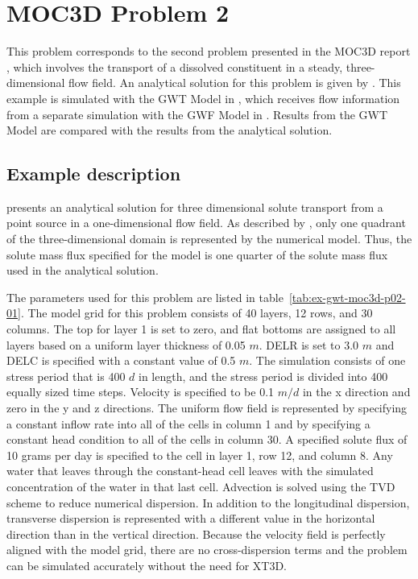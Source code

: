 \section{MOC3D Problem 2}

This problem corresponds to the second problem presented in the MOC3D report \cite{konikow1996three}, which involves the transport of a dissolved constituent in a steady, three-dimensional flow field.  An analytical solution for this problem is given by \cite{wexler1992}.  This example is simulated with the GWT Model in \mf, which receives flow information from a separate simulation with the GWF Model in \mf.  Results from the GWT Model are compared with the results from the \cite{wexler1992} analytical solution.

\subsection{Example description}
\cite{wexler1992} presents an analytical solution for three dimensional solute transport from a point source in a one-dimensional flow field.  As described by \cite{konikow1996three}, only one quadrant of the three-dimensional domain is represented by the numerical model.  Thus, the solute mass flux specified for the model is one quarter of the solute mass flux used in the analytical solution.  

The parameters used for this problem are listed in table~\ref{tab:ex-gwt-moc3d-p02-01}.  The model grid for this problem consists of 40 layers, 12 rows, and 30 columns.  The top for layer 1 is set to zero, and flat bottoms are assigned to all layers based on a uniform layer thickness of 0.05 $m$.  DELR is set to 3.0 $m$ and DELC is specified with a constant value of 0.5 $m$.  The simulation consists of one stress period that is 400 $d$ in length, and the stress period is divided into 400 equally sized time steps.  Velocity is specified to be 0.1 $m/d$ in the x direction and zero in the y and z directions.  The uniform flow field is represented by specifying a constant inflow rate into all of the cells in column 1 and by specifying a constant head condition to all of the cells in column 30.  A specified solute flux of 10 grams per day is specified to the cell in layer 1, row 12, and column 8.  Any water that leaves through the constant-head cell leaves with the simulated concentration of the water in that last cell.   Advection is solved using the TVD scheme to reduce numerical dispersion.  In addition to the longitudinal dispersion, transverse dispersion is represented with a different value in the horizontal direction than in the vertical direction.  Because the velocity field is perfectly aligned with the model grid, there are no cross-dispersion terms and the problem can be simulated accurately without the need for XT3D.

